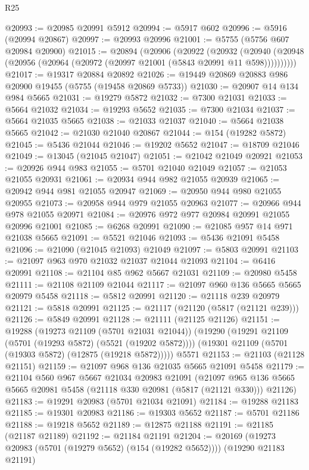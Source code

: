 \begin{lexlean}{R25}
\begin{coremodule}
@20993 := @20985 @20991 @5912
@20994 := @5917 @602
@20996 := @5916 (@20994 @20867)
@20997 := @20993 @20996
@21001 := @5755 (@5756 @607 @20984 @20900)
@21015 := @20894
    (@20906
      (@20922
        (@20932
          (@20940 (@20948 (@20956 (@20964 (@20972 (@20997 @21001 (@5843 @20991 @11 @598))))))))))
@21017 := @19317 @20884 @20892
@21026 := @19449 @20869 @20883 @986 @20900 @19455 (@5755 (@19458 @20869 @5733))
@21030 := @20907 @14 @134 @984 @5665
@21031 := @19279 @5872
@21032 := @7300 @21031
@21033 := @5664 @21032
@21034 := @19293 @5652
@21035 := @7300 @21034
@21037 := @5664 @21035 @5665
@21038 := @21033 @21037
@21040 := @5664 @21038 @5665
@21042 := @21030 @21040 @20867
@21044 := @154 (@19282 @5872)
@21045 := @5436 @21044
@21046 := @19202 @5652
@21047 := @18709 @21046
@21049 := @13045 (@21045 @21047)
@21051 := @21042 @21049 @20921
@21053 := @20926 @944 @983
@21055 := @5701 @21040 @21049
@21057 := @21053 @21055 @20931
@21061 := @20934 @944 @982 @21055 @20939
@21065 := @20942 @944 @981 @21055 @20947
@21069 := @20950 @944 @980 @21055 @20955
@21073 := @20958 @944 @979 @21055 @20963
@21077 := @20966 @944 @978 @21055 @20971
@21084 := @20976 @972 @977 @20984 @20991 @21055 @20996 @21001
@21085 := @6268 @20991
@21090 := @21085 @957 @14 @971 @21038 @5665
@21091 := @5521 @21046
@21093 := @5436 @21091 @5458
@21096 := @21090 (@21045 @21093) @21049
@21097 := @5803 @20991
@21103 := @21097 @963 @970 @21032 @21037 @21044 @21093
@21104 := @6416 @20991
@21108 := @21104 @85 @962 @5667 @21031
@21109 := @20980 @5458
@21111 := @21108 @21109 @21044
@21117 := @21097 @960 @136 @5665 @5665 @20979 @5458
@21118 := @5812 @20991
@21120 := @21118 @239 @20979
@21121 := @5818 @20991
@21125 := @21117 (@21120 (@5817 (@21121 @239)))
@21126 := @5849 @20991
@21128 := @21111 (@21125 @21126)
@21151 := @19288
    (@19273 @21109 (@5701 @21031 @21044))
    (@19290
      (@19291 @21109 (@5701 (@19293 @5872) (@5521 (@19202 @5872))))
      (@19301 @21109 (@5701 (@19303 @5872) (@12875 (@19218 @5872)))))
    @5571
@21153 := @21103 (@21128 @21151)
@21159 := @21097 @968 @136 @21035 @5665 @21091 @5458
@21179 := @21104
    @560
    @967
    @5667
    @21034
    @20983
    @21091
    (@21097 @965 @136 @5665 @5665 @20981 @5458 (@21118 @330 @20981 (@5817 (@21121 @330))) @21126)
@21183 := @19291 @20983 (@5701 @21034 @21091)
@21184 := @19288 @21183
@21185 := @19301 @20983
@21186 := @19303 @5652
@21187 := @5701 @21186
@21188 := @19218 @5652
@21189 := @12875 @21188
@21191 := @21185 (@21187 @21189)
@21192 := @21184 @21191
@21204 := @20169
    (@19273 @20983 (@5701 (@19279 @5652) (@154 (@19282 @5652))))
    (@19290 @21183 @21191)

\end{coremodule}
\end{lexlean}
